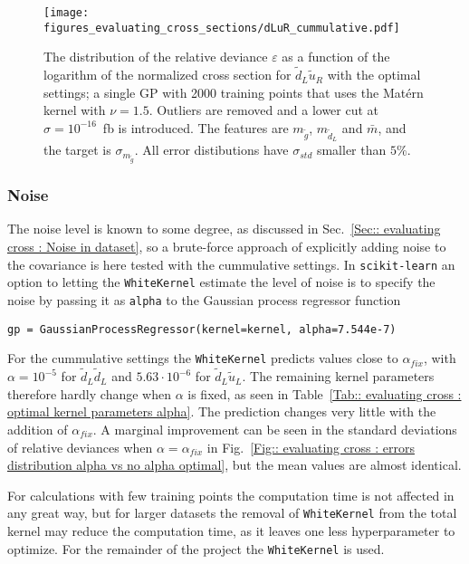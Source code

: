 \documentclass[twoside,english]{uiofysmaster}
\begin{document}
{\begin{figure}
\centering
\texttt{[image: figures\_evaluating\_cross\_sections/dLuR\_cummulative.pdf]}
\caption{The distribution of the relative deviance $\varepsilon$ as a function of the logarithm of the normalized cross section for $\widetilde{d}_L \widetilde{u}_R$ with the optimal settings; a single GP with 2000 training points that uses the Mat\'{e}rn kernel with $\nu=1.5$. Outliers are removed and a lower cut at $\sigma=10^{-16}$~fb is introduced. The features are $m_{\widetilde{g}}$, $m_{\widetilde{d}_L}$ and $\bar{m}$, and the target is $\sigma_{m_{\widetilde{g}}}$. All error distibutions have $\sigma_{std}$ smaller than $5\%$.}
\label{Fig:: evaluating cross : error distribution dLuR optimal}
\end{figure}

\subsubsection{Noise}

The noise level is known to some degree, as discussed in Sec.~\ref{Sec:: evaluating cross : Noise in dataset}, so a brute-force approach of explicitly adding noise to the covariance is here tested with the cummulative settings. In \verb|scikit-learn| an option to letting the \verb|WhiteKernel| estimate the level of noise is to specify the noise by passing it as \verb|alpha| to the Gaussian process regressor function
\begin{lstlisting}
gp = GaussianProcessRegressor(kernel=kernel, alpha=7.544e-7)
\end{lstlisting}


For the cummulative settings the \verb|WhiteKernel| predicts values close to $\alpha_{fix}$, with $\alpha=10^{-5}$ for $\widetilde{d}_L \widetilde{d}_L$ and $5.63 \cdot 10^{-6}$ for $\widetilde{d}_L \widetilde{u}_L$. The remaining kernel parameters therefore hardly change when $\alpha$ is fixed, as seen in Table~\ref{Tab:: evaluating cross : optimal kernel parameters alpha}. The prediction changes very little with the addition of $\alpha_{fix}$. A marginal improvement can be seen in the standard deviations of relative deviances when $\alpha = \alpha_{fix}$ in Fig.~\ref{Fig:: evaluating cross : errors distribution alpha vs no alpha optimal}, but the mean values are almost identical.

For calculations with few training points the computation time is not affected in any great way, but for larger datasets the removal of \verb|WhiteKernel| from the total kernel may reduce the computation time, as it leaves one less hyperparameter to optimize. For the remainder of the project the \verb|WhiteKernel| is used.


}
\end{document}
